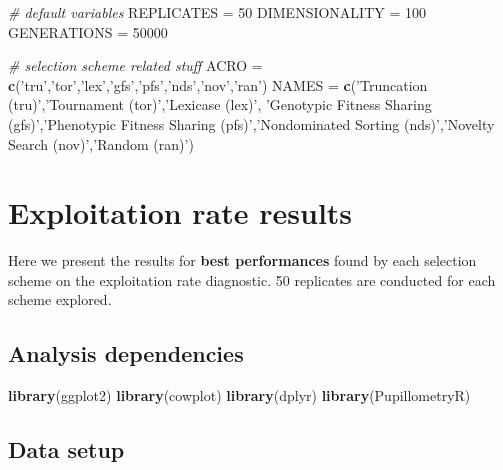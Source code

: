 \documentclass[]{book}
\newenvironment{Shaded}{\begin{snugshade}}{\end{snugshade}}
\newcommand{\CommentTok}[1]{\textcolor[rgb]{0.56,0.35,0.01}{\textit{#1}}}
\newcommand{\DecValTok}[1]{\textcolor[rgb]{0.00,0.00,0.81}{#1}}
\newcommand{\KeywordTok}[1]{\textcolor[rgb]{0.13,0.29,0.53}{\textbf{#1}}}
\newcommand{\NormalTok}[1]{#1}
\newcommand{\StringTok}[1]{\textcolor[rgb]{0.31,0.60,0.02}{#1}}
\begin{document}
\begin{Shaded}
\begin{Highlighting}[]
\CommentTok{# default variables}
\NormalTok{REPLICATES =}\StringTok{ }\DecValTok{50}
\NormalTok{DIMENSIONALITY =}\StringTok{ }\DecValTok{100}
\NormalTok{GENERATIONS =}\StringTok{ }\DecValTok{50000}

\CommentTok{# selection scheme related stuff}
\NormalTok{ACRO =}\StringTok{ }\KeywordTok{c}\NormalTok{(}\StringTok{'tru'}\NormalTok{,}\StringTok{'tor'}\NormalTok{,}\StringTok{'lex'}\NormalTok{,}\StringTok{'gfs'}\NormalTok{,}\StringTok{'pfs'}\NormalTok{,}\StringTok{'nds'}\NormalTok{,}\StringTok{'nov'}\NormalTok{,}\StringTok{'ran'}\NormalTok{)}
\NormalTok{NAMES =}\StringTok{ }\KeywordTok{c}\NormalTok{(}\StringTok{'Truncation (tru)'}\NormalTok{,}\StringTok{'Tournament (tor)'}\NormalTok{,}\StringTok{'Lexicase (lex)'}\NormalTok{, }\StringTok{'Genotypic Fitness Sharing (gfs)'}\NormalTok{,}\StringTok{'Phenotypic Fitness Sharing (pfs)'}\NormalTok{,}\StringTok{'Nondominated Sorting (nds)'}\NormalTok{,}\StringTok{'Novelty Search (nov)'}\NormalTok{,}\StringTok{'Random (ran)'}\NormalTok{)}
\end{Highlighting}
\end{Shaded}

\hypertarget{exploitation-rate-results}{%
\chapter{Exploitation rate results}\label{exploitation-rate-results}}

Here we present the results for \textbf{best performances} found by each selection scheme on the exploitation rate diagnostic.
50 replicates are conducted for each scheme explored.

\hypertarget{analysis-dependencies}{%
\section{Analysis dependencies}\label{analysis-dependencies}}

\begin{Shaded}
\begin{Highlighting}[]
\KeywordTok{library}\NormalTok{(ggplot2)}
\KeywordTok{library}\NormalTok{(cowplot)}
\KeywordTok{library}\NormalTok{(dplyr)}
\KeywordTok{library}\NormalTok{(PupillometryR)}
\end{Highlighting}
\end{Shaded}

\hypertarget{data-setup}{%
\section{Data setup}\label{data-setup}}
\end{document}
